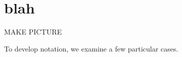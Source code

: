 \documentclass[11pt]{report}
\begin{document}
\section{blah}

MAKE PICTURE

To develop notation, we examine a few particular cases. 
\end{document}

